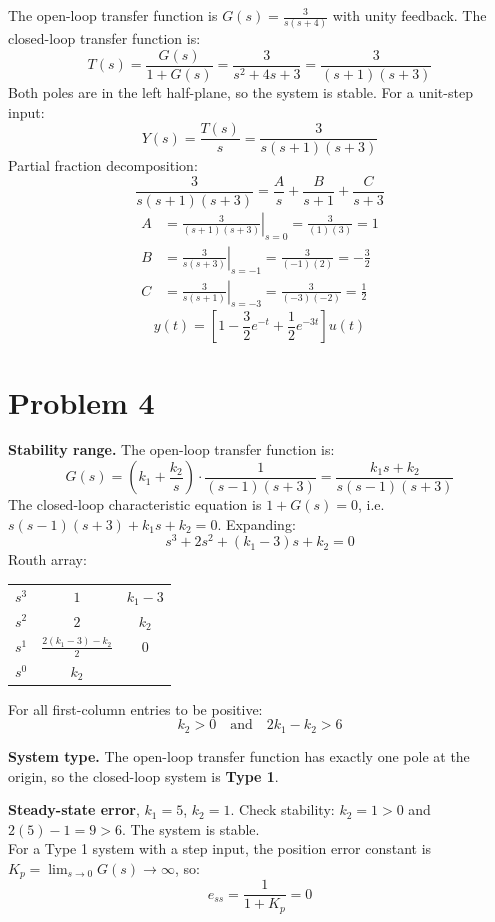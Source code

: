 \documentclass[12pt]{article}
\begin{document}
The open-loop transfer function is $G(s) = \frac{3}{s(s + 4)}$ with unity feedback. The closed-loop transfer function is:
\[
T(s) = \frac{G(s)}{1 + G(s)} = \frac{3}{s^2 + 4s + 3} = \frac{3}{(s + 1)(s + 3)}
\]
Both poles are in the left half-plane, so the system is stable. For a unit-step input:
\[
Y(s) = \frac{T(s)}{s} = \frac{3}{s(s + 1)(s + 3)}
\]
Partial fraction decomposition:
\[
\frac{3}{s(s + 1)(s + 3)} = \frac{A}{s} + \frac{B}{s + 1} + \frac{C}{s + 3}
\]
\begin{align*}
A &= \left. \frac{3}{(s + 1)(s + 3)} \right|_{s=0} = \frac{3}{(1)(3)} = 1 \\[1ex]
B &= \left. \frac{3}{s(s + 3)} \right|_{s=-1} = \frac{3}{(-1)(2)} = -\frac{3}{2} \\[1ex]
C &= \left. \frac{3}{s(s + 1)} \right|_{s=-3} = \frac{3}{(-3)(-2)} = \frac{1}{2}
\end{align*}
\[
\boxed{y(t) = \left[ 1 - \frac{3}{2} e^{-t} + \frac{1}{2} e^{-3t} \right] u(t)}
\]

\section*{Problem 4}

\textbf{Stability range.} The open-loop transfer function is:
\[
G(s) = \left( k_1 + \frac{k_2}{s} \right) \cdot \frac{1}{(s - 1)(s + 3)} = \frac{k_1s + k_2}{s(s - 1)(s + 3)}
\]
The closed-loop characteristic equation is $1 + G(s) = 0$, i.e.\ $s(s - 1)(s + 3) + k_1s + k_2 = 0$.
Expanding:
\[
s^3 + 2s^2 + (k_1 - 3)s + k_2 = 0
\]
Routh array:
\begin{center}
\renewcommand{\arraystretch}{1.5}
\begin{tabular}{c|cc}
$s^3$ & $1$ & $k_1 - 3$ \\
$s^2$ & $2$ & $k_2$ \\
$s^1$ & $\frac{2(k_1 - 3) - k_2}{2}$ & $0$ \\
$s^0$ & $k_2$ & 
\end{tabular}
\end{center}
For all first-column entries to be positive:
\[
\boxed{k_2 > 0 \quad \text{and} \quad 2k_1 - k_2 > 6}
\]

\textbf{System type.} The open-loop transfer function has exactly one pole at the origin, so the closed-loop system is \textbf{Type 1}.

\vspace{0.5em}
\noindent \textbf{Steady-state error}, $k_1 = 5$, $k_2 = 1$. Check stability: $k_2 = 1 > 0$ and $2(5) - 1 = 9 > 6$. The system is stable.
\\
For a Type 1 system with a step input, the position error constant is $K_p = \lim_{s \to 0} G(s) \to \infty$, so:
\[
\boxed{e_{ss} = \frac{1}{1 + K_p} = 0}
\]
\end{document}
